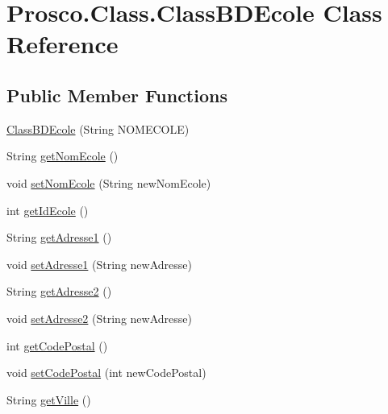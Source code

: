 \hypertarget{class_prosco_1_1_class_1_1_class_b_d_ecole}{\section{Prosco.\-Class.\-Class\-B\-D\-Ecole Class Reference}
\label{class_prosco_1_1_class_1_1_class_b_d_ecole}
}
\subsection*{Public Member Functions}
\begin{DoxyCompactItemize}
\item 
\hyperlink{class_prosco_1_1_class_1_1_class_b_d_ecole_a5b607d51eb6d2fbc49e653f7be26d52f}{Class\-B\-D\-Ecole} (String N\-O\-M\-E\-C\-O\-L\-E)
\item 
String \hyperlink{class_prosco_1_1_class_1_1_class_b_d_ecole_aa1aa568ceeda8e6be965918f2f4ee326}{get\-Nom\-Ecole} ()
\item 
void \hyperlink{class_prosco_1_1_class_1_1_class_b_d_ecole_ac6bcca29b5dd3986ec40a4dbc615e2aa}{set\-Nom\-Ecole} (String new\-Nom\-Ecole)
\item 
int \hyperlink{class_prosco_1_1_class_1_1_class_b_d_ecole_a954f35bb6410dcac712cd71949858126}{get\-Id\-Ecole} ()
\item 
String \hyperlink{class_prosco_1_1_class_1_1_class_b_d_ecole_a208dd2174b21706cfcf8528089104b4c}{get\-Adresse1} ()
\item 
void \hyperlink{class_prosco_1_1_class_1_1_class_b_d_ecole_aa9f06c5c6ec93899825335cde0323099}{set\-Adresse1} (String new\-Adresse)
\item 
String \hyperlink{class_prosco_1_1_class_1_1_class_b_d_ecole_a8c91466e414ebca4f0603666a13bb189}{get\-Adresse2} ()
\item 
void \hyperlink{class_prosco_1_1_class_1_1_class_b_d_ecole_a86ae4c82f7c9eb9185d43b0144b84786}{set\-Adresse2} (String new\-Adresse)
\item 
int \hyperlink{class_prosco_1_1_class_1_1_class_b_d_ecole_ac1e324b6078a984c6fe019c18da47393}{get\-Code\-Postal} ()
\item 
void \hyperlink{class_prosco_1_1_class_1_1_class_b_d_ecole_aa5d09349160fdea46fe2df83ff0d129e}{set\-Code\-Postal} (int new\-Code\-Postal)
\item 
String \hyperlink{class_prosco_1_1_class_1_1_class_b_d_ecole_ad58a6aaa25efcbc7a18149b20b53ea69}{get\-Ville} ()
\item 

\end{DoxyCompactItemize}
